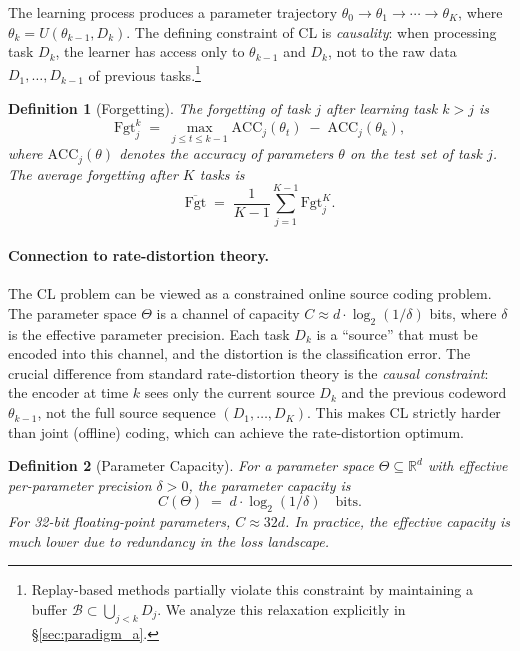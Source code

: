 \documentclass{article}
\newtheorem{definition}{Definition}
\begin{document}
The learning process produces a parameter trajectory $\theta_0 \to \theta_1 \to \cdots \to \theta_K$, where $\theta_k = U(\theta_{k-1}, D_k)$. The defining constraint of CL is \emph{causality}: when processing task $D_k$, the learner has access only to $\theta_{k-1}$ and $D_k$, not to the raw data $D_1, \ldots, D_{k-1}$ of previous tasks.\footnote{Replay-based methods partially violate this constraint by maintaining a buffer $\mathcal{B} \subset \bigcup_{j<k} D_j$. We analyze this relaxation explicitly in \S\ref{sec:paradigm_a}.}

\begin{definition}[Forgetting]
\label{def:forgetting}
The \emph{forgetting} of task $j$ after learning task $k > j$ is
\begin{equation}
    \mathrm{Fgt}_j^k \;=\; \max_{j \leq t \leq k-1} \mathrm{ACC}_j(\theta_t) \;-\; \mathrm{ACC}_j(\theta_k),
\end{equation}
where $\mathrm{ACC}_j(\theta)$ denotes the accuracy of parameters $\theta$ on the test set of task $j$. The \emph{average forgetting} after $K$ tasks is
\begin{equation}
    \overline{\mathrm{Fgt}} \;=\; \frac{1}{K-1}\sum_{j=1}^{K-1} \mathrm{Fgt}_j^K.
\end{equation}
\end{definition}

\paragraph{Connection to rate-distortion theory.} The CL problem can be viewed as a constrained online source coding problem. The parameter space $\Theta$ is a channel of capacity $C \approx d \cdot \log_2(1/\delta)$ bits, where $\delta$ is the effective parameter precision. Each task $D_k$ is a ``source'' that must be encoded into this channel, and the distortion is the classification error. The crucial difference from standard rate-distortion theory is the \emph{causal constraint}: the encoder at time $k$ sees only the current source $D_k$ and the previous codeword $\theta_{k-1}$, not the full source sequence $(D_1, \ldots, D_K)$. This makes CL strictly harder than joint (offline) coding, which can achieve the rate-distortion optimum.

\begin{definition}[Parameter Capacity]
\label{def:capacity}
For a parameter space $\Theta \subseteq \mathbb{R}^d$ with effective per-parameter precision $\delta > 0$, the \emph{parameter capacity} is
\begin{equation}
    C(\Theta) \;=\; d \cdot \log_2(1/\delta) \quad \text{bits}.
\end{equation}
For 32-bit floating-point parameters, $C \approx 32d$. In practice, the effective capacity is much lower due to redundancy in the loss landscape.
\end{definition}
\end{document}
